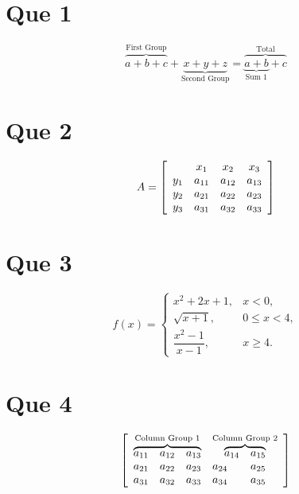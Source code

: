 \documentclass[12pt,a4paper]{article}
\begin{document}
	
	\section*{Que 1}
	\[
	\overbrace{a+b+c}^{\text{First Group}}
	+\underbrace{x+y+z}_{\text{Second Group}}
	=
	\overbrace{\underbrace{a+b}_{\text{Sum 1}}+c}^{\text{Total}}
	\]
	
	\section*{Que 2}
	\[
	A=
	\left[
	\begin{array}{c ccc}
		& x_1 & x_2 & x_3 \\
		y_1 & a_{11} & a_{12} & a_{13} \\
		y_2 & a_{21} & a_{22} & a_{23} \\
		y_3 & a_{31} & a_{32} & a_{33}
	\end{array}
	\right]
	\]
	
	\section*{Que 3}
	\[
	f(x)=
	\begin{cases}
		x^{2}+2x+1, & x<0,\\[4pt]
		\sqrt{x+1}, & 0\le x<4,\\[4pt]
		\dfrac{x^{2}-1}{x-1}, & x\ge 4.
	\end{cases}
	\]
	
	\section*{Que 4}
	\[
	\left[
	\begin{array}{ccccc}
		\multicolumn{3}{c}{\overbrace{a_{11}\quad a_{12}\quad a_{13}}^{\text{Column Group 1}}} &
		\multicolumn{2}{c}{\overbrace{a_{14}\quad a_{15}}^{\text{Column Group 2}}} \\
		a_{21} & a_{22} & a_{23} & a_{24} & a_{25} \\
		a_{31} & a_{32} & a_{33} & a_{34} & a_{35}
	\end{array}
	\right]
	\]
	
\end{document}
